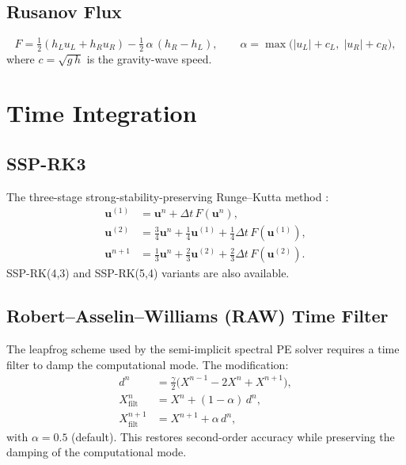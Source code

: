 \documentclass[11pt,twoside]{report}
\newcommand{\half}{\tfrac{1}{2}}
\newcommand{\vect}[1]{\bm{#1}}
\begin{document}
\subsection{Rusanov Flux}
\begin{equation}
  F = \half(h_L u_L + h_R u_R) - \half\,\alpha\,(h_R-h_L),
  \qquad \alpha=\max\!\bigl(|u_L|+c_L,\;|u_R|+c_R\bigr),
\end{equation}
where $c=\sqrt{g\,h}$ is the gravity-wave speed.


\section{Time Integration}
\label{sec:timestepping}

\subsection{SSP-RK3}

The three-stage strong-stability-preserving Runge--Kutta method
\citep{ShuOsher1988}:
\begin{align}
  \vect{u}^{(1)} &= \vect{u}^n + \Delta t\,F(\vect{u}^n), \\
  \vect{u}^{(2)} &= \tfrac{3}{4}\vect{u}^n + \tfrac{1}{4}\vect{u}^{(1)}
  + \tfrac{1}{4}\Delta t\,F(\vect{u}^{(1)}), \\
  \vect{u}^{n+1} &= \tfrac{1}{3}\vect{u}^n + \tfrac{2}{3}\vect{u}^{(2)}
  + \tfrac{2}{3}\Delta t\,F(\vect{u}^{(2)}).
\end{align}
SSP-RK(4,3) and SSP-RK(5,4) variants are also available.

\subsection{Robert--Asselin--Williams (RAW) Time Filter}

The leapfrog scheme used by the semi-implicit spectral PE solver requires
a time filter to damp the computational mode.  The \citet{Williams2009}
modification:
\begin{align}
  d^n &= \frac{\gamma}{2}\bigl(X^{n-1}-2X^n+X^{n+1}\bigr), \\
  X^n_{\mathrm{filt}} &= X^n + (1-\alpha)\,d^n, \\
  X^{n+1}_{\mathrm{filt}} &= X^{n+1} + \alpha\,d^n,
\end{align}
with $\alpha=0.5$ (default).  This restores second-order accuracy while
preserving the damping of the computational mode.
\end{document}

